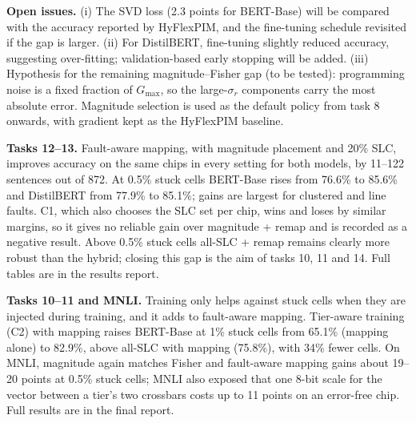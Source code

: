 \documentclass[10pt,a4paper]{article}
\begin{document}
\noindent\textbf{Open issues.} (i) The SVD loss (2.3 points for BERT-Base) will be compared with the
accuracy reported by HyFlexPIM, and the fine-tuning schedule revisited if the gap is larger. (ii) For
DistilBERT, fine-tuning slightly reduced accuracy, suggesting over-fitting; validation-based early
stopping will be added. (iii) Hypothesis for the remaining magnitude--Fisher gap (to be tested):
programming noise is a fixed fraction of $G_{\max}$, so the large-$\sigma_r$ components carry the most
absolute error. Magnitude selection is used as the default policy from task 8 onwards, with gradient
kept as the HyFlexPIM baseline.

\noindent\textbf{Tasks 12--13.} Fault-aware mapping, with magnitude placement and 20\% SLC, improves accuracy
on the same chips in every setting for both models, by 11--122 sentences out of 872. At 0.5\% stuck cells
BERT-Base rises from 76.6\% to 85.6\% and DistilBERT from 77.9\% to 85.1\%; gains are largest for clustered
and line faults. C1, which also chooses the SLC set per chip, wins and loses by similar margins, so it gives
no reliable gain over magnitude + remap and is recorded as a negative result. Above 0.5\% stuck cells
all-SLC + remap remains clearly more robust than the hybrid; closing this gap is the aim of tasks 10, 11
and 14. Full tables are in the results report.

\noindent\textbf{Tasks 10--11 and MNLI.} Training only helps against stuck cells when they are injected during
training, and it adds to fault-aware mapping. Tier-aware training (C2) with mapping raises BERT-Base at 1\%
stuck cells from 65.1\% (mapping alone) to 82.9\%, above all-SLC with mapping (75.8\%), with 34\% fewer
cells. On MNLI, magnitude again matches Fisher and fault-aware mapping gains about 19--20 points at 0.5\%
stuck cells; MNLI also exposed that one 8-bit scale for the vector between a tier's two crossbars costs up
to 11 points on an error-free chip. Full results are in the final report.
\end{document}
